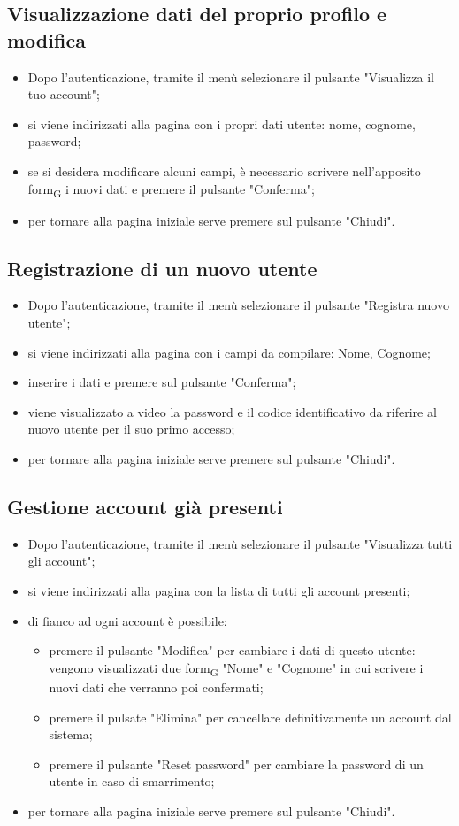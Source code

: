 \subsection{Visualizzazione dati del proprio profilo e modifica}
\begin{itemize}
    \item Dopo l'autenticazione, tramite il menù selezionare il pulsante "Visualizza il tuo account";
    \item si viene indirizzati alla pagina con i propri dati utente: nome, cognome, password;
    \item se si desidera modificare alcuni campi, è necessario scrivere nell'apposito form\textsubscript{G} i nuovi dati e premere il pulsante "Conferma";
    \item per tornare alla pagina iniziale serve premere sul pulsante "Chiudi".
\end{itemize}
\subsection{Registrazione di un nuovo utente}
\begin{itemize}
    \item Dopo l'autenticazione, tramite il menù selezionare il pulsante "Registra nuovo utente";
    \item si viene indirizzati alla pagina con i campi da compilare: Nome, Cognome;
    \item inserire i dati e premere sul pulsante "Conferma";
    \item viene visualizzato a video la password e il codice identificativo da riferire al nuovo utente per il suo primo accesso;
    \item per tornare alla pagina iniziale serve premere sul pulsante "Chiudi".
\end{itemize}
\subsection{Gestione account già presenti}
\begin{itemize}
    \item Dopo l'autenticazione, tramite il menù selezionare il pulsante "Visualizza tutti gli account";
    \item si viene indirizzati alla pagina con la lista di tutti gli account presenti;
    \item di fianco ad ogni account è possibile:
        \begin{itemize}
            \item premere il pulsante "Modifica" per cambiare i dati di questo utente: vengono visualizzati due form\textsubscript{G} "Nome" e "Cognome" in cui scrivere i nuovi dati che verranno poi confermati;
            \item premere il pulsate "Elimina" per cancellare definitivamente un account dal sistema;
            \item premere il pulsante "Reset password" per cambiare la password di un utente in caso di smarrimento;
        \end{itemize}
    \item per tornare alla pagina iniziale serve premere sul pulsante "Chiudi".
\end{itemize}
